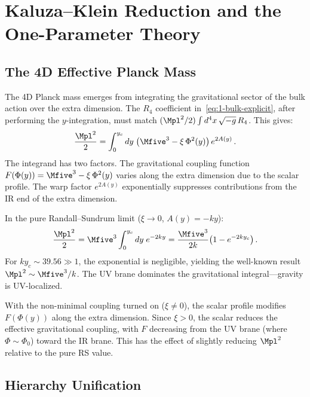 \section{Kaluza--Klein Reduction and the One-Parameter Theory}
\label{sec:1-kk}

\subsection{The 4D Effective Planck Mass}
\label{sec:1-planck}

The 4D Planck mass emerges from integrating the gravitational sector of the bulk action over the extra dimension. The $R_4$ coefficient in~\eqref{eq:1-bulk-explicit}, after performing the $y$-integration, must match $(\Mpl^2/2)\int d^4x\, \sqrt{-g}\, R_4$. This gives:
\begin{equation}
\label{eq:1-mpl}
\frac{\Mpl^2}{2} = \int_0^{y_c} dy\; \bigl(\Mfive^3 - \xi\,\Phi^2(y)\bigr)\, e^{2A(y)}\,.
\end{equation}
The integrand has two factors. The gravitational coupling function $F(\Phi(y)) = \Mfive^3 - \xi\,\Phi^2(y)$ varies along the extra dimension due to the scalar profile. The warp factor $e^{2A(y)}$ exponentially suppresses contributions from the IR end of the extra dimension.

In the pure Randall--Sundrum limit ($\xi \to 0$, $A(y) = -ky$):
\begin{equation}
\label{eq:1-mpl-rs}
\frac{\Mpl^2}{2} = \Mfive^3 \int_0^{y_c} dy\; e^{-2ky}
= \frac{\Mfive^3}{2k}\bigl(1 - e^{-2ky_c}\bigr)\,.
\end{equation}
For $ky_c \sim 39.56 \gg 1$, the exponential is negligible, yielding the well-known result $\Mpl^2 \sim \Mfive^3/k$. The UV brane dominates the gravitational integral---gravity is UV-localized.

With the non-minimal coupling turned on ($\xi \neq 0$), the scalar profile modifies $F(\Phi(y))$ along the extra dimension. Since $\xi > 0$, the scalar reduces the effective gravitational coupling, with $F$ decreasing from the UV brane (where $\Phi \sim \Phi_0$) toward the IR brane. This has the effect of slightly reducing $\Mpl^2$ relative to the pure RS value.

\subsection{Hierarchy Unification}
\label{sec:1-hierarchy}

